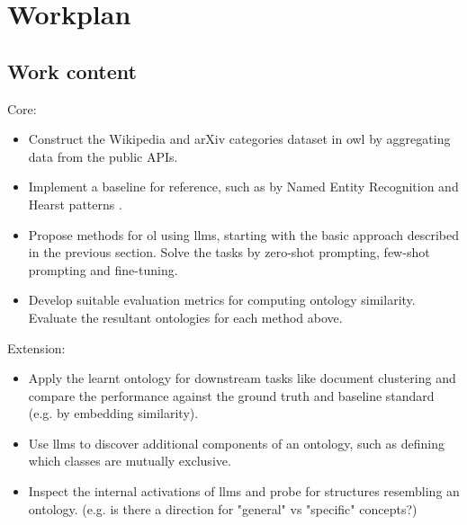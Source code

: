 \section*{Workplan}

\subsection*{Work content}

Core:
\begin{itemize}
    \item Construct the Wikipedia and arXiv categories dataset in \gls{owl} by aggregating data from the public APIs.
    \item Implement a baseline for reference, such as by Named Entity Recognition and Hearst patterns \citep{hearst}.
    \item Propose methods for \gls{ol} using \gls{llm}s, starting with the basic approach described in the previous section. Solve the tasks by zero-shot prompting, few-shot prompting and fine-tuning.
    \item Develop suitable evaluation metrics for computing ontology similarity. Evaluate the resultant ontologies for each method above.
\end{itemize}

Extension:
\begin{itemize}
    \item Apply the learnt ontology for downstream tasks like document clustering and compare the performance against the ground truth and baseline standard (e.g. by embedding similarity).
    \item Use \gls{llm}s to discover additional components of an ontology, such as defining which classes are mutually exclusive.
    \item Inspect the internal activations of \gls{llm}s and probe for structures resembling an ontology. (e.g. is there a direction for "general" vs "specific" concepts?)
\end{itemize}

